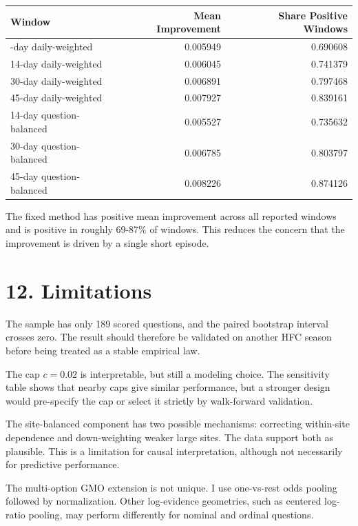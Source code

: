 \documentclass[
]{article}
\newcounter{none} %
\begin{document}
{\def\LTcaptype{none} %
\begin{longtable}[]{@{}lrr@{}}
\toprule\noalign{}
Window & Mean Improvement & Share Positive Windows \\
\midrule\noalign{}
\endhead
\bottomrule\noalign{}
\endlastfoot
7-day daily-weighted & 0.005949 & 0.690608 \\
14-day daily-weighted & 0.006045 & 0.741379 \\
30-day daily-weighted & 0.006891 & 0.797468 \\
45-day daily-weighted & 0.007927 & 0.839161 \\
14-day question-balanced & 0.005527 & 0.735632 \\
30-day question-balanced & 0.006785 & 0.803797 \\
45-day question-balanced & 0.008226 & 0.874126 \\
\end{longtable}
}

The fixed method has positive mean improvement across all reported
windows and is positive in roughly 69-87\% of windows. This reduces the
concern that the improvement is driven by a single short episode.

\section{12. Limitations}\label{limitations}

The sample has only 189 scored questions, and the paired bootstrap
interval crosses zero. The result should therefore be validated on
another HFC season before being treated as a stable empirical law.

The cap \(c=0.02\) is interpretable, but still a modeling choice. The
sensitivity table shows that nearby caps give similar performance, but a
stronger design would pre-specify the cap or select it strictly by
walk-forward validation.

The site-balanced component has two possible mechanisms: correcting
within-site dependence and down-weighting weaker large sites. The data
support both as plausible. This is a limitation for causal
interpretation, although not necessarily for predictive performance.

The multi-option GMO extension is not unique. I use one-vs-rest odds
pooling followed by normalization. Other log-evidence geometries, such
as centered log-ratio pooling, may perform differently for nominal and
ordinal questions.
\end{document}
